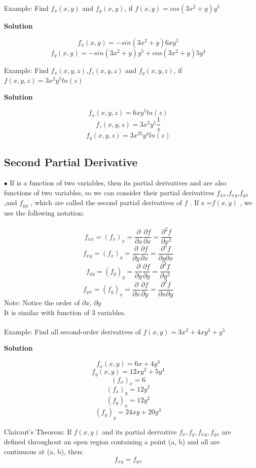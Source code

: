 \documentclass[12pt]{article}
\begin{document}
Example: Find $f_x(x,y)$ and $f_y(x,y)$, if $f(x,y) = cos(3x^2+y)y^5 $
 \begin{center}
     \textbf{Solution}
 \end{center}
 $$f_x(x,y) = -sin(3x^2+y)6xy^5$$
 $$f_y(x,y) = -sin(3x^2+y)y^5 + cos(3x^2+y)5y^4$$
 
 Example: Find $f_x(x,y,z)$,$f_z(x,y,z)$ and $f_y(x,y,z)$, if $f(x,y,z) = 3x^2y^5ln(z) $
  \begin{center}
     \textbf{Solution}
 \end{center}
 $$f_x(x,y,z) = 6xy^5ln(z)$$
 $$f_z(x,y,z)= 3x^2y^5\frac{1}{z}$$
 $$f_y(x,y,z)= 3x^25y^4ln(z)$$
 
 \subsection{Second Partial Derivative}
 $\bullet$  If is a function of two variables, then its partial derivatives and are also functions of two variables, so we can consider their partial derivatives $f_x{}_x$,$f_x{}_y$,$f_y{}_x$,and $f_y{}_y$ , which are called the second partial derivatives of $f$ . If z =$f(x,y)$ , we use the following notation:\\
 \\
 $$f_x{}_x = (f_x)_x = \frac{\partial}{\partial x} \frac{\partial f}{\partial x}= \frac{\partial^2 f}{\partial x^2}$$
 $$f_x{}_y = (f_x)_y = \frac{\partial}{\partial y} \frac{\partial f}{\partial x}= \frac{\partial^2 f}{\partial y \partial x}$$
 $$f_y{}_y = (f_y)_y = \frac{\partial}{\partial y} \frac{\partial f}{\partial y}= \frac{\partial^2 f}{\partial y^2}$$
 $$f_y{}_x = (f_y)_x = \frac{\partial}{\partial x} \frac{\partial f}{\partial y}= \frac{\partial^2 f}{\partial x \partial y}$$
 Note: Notice the order of $\partial x$, $\partial y$\\
 It is similar with function of 3 variables.\\
 \\
 Example: Find all second-order derivatives of $f(x,y) = 3x^2 + 4xy^3 + y^5$ \\
 \begin{center}
     \textbf{Solution}
 \end{center}
 $$f_x(x,y) = 6x + 4y^3$$
 $$f_y(x,y) = 12xy^2 + 5y^4$$
 $$(f_x)_x = 6$$
 $$(f_x)_y = 12y^2$$
 $$(f_y)_x = 12y^2$$
 $$(f_y)_y = 24xy + 20y^3$$
 
 \begin{mybox}
     Clairaut’s Theorem: If $f(x,y)$ and its partial derivative $f_x, f_y, f_x{}_y, f_y{}_x$ are defined throughout an open region containing a point (a, b) and all are continuous at (a, b), then:
     $$f_x{}_y = f_y{}_x$$
 \end{mybox}
 
\end{document}
